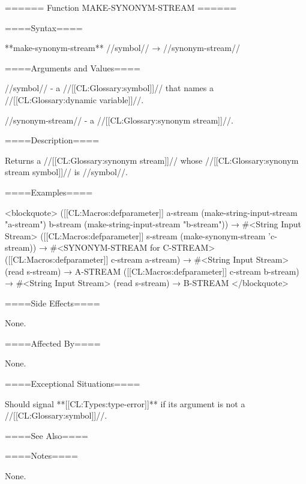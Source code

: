 ====== Function MAKE-SYNONYM-STREAM ======

====Syntax====

**make-synonym-stream** //symbol// → //synonym-stream//

====Arguments and Values====

//symbol// - a //[[CL:Glossary:symbol]]// that names a //[[CL:Glossary:dynamic variable]]//.

//synonym-stream// - a //[[CL:Glossary:synonym stream]]//.

====Description====

Returns a //[[CL:Glossary:synonym stream]]// whose //[[CL:Glossary:synonym stream symbol]]// is //symbol//.

====Examples====

<blockquote> ([[CL:Macros:defparameter]] a-stream (make-string-input-stream "a-stream") b-stream (make-string-input-stream "b-stream")) → #<String Input Stream> ([[CL:Macros:defparameter]] s-stream (make-synonym-stream 'c-stream)) → #<SYNONYM-STREAM for C-STREAM> ([[CL:Macros:defparameter]] c-stream a-stream) → #<String Input Stream> (read s-stream) → A-STREAM ([[CL:Macros:defparameter]] c-stream b-stream) → #<String Input Stream> (read s-stream) → B-STREAM </blockquote>

====Side Effects====

None.

====Affected By====

None.

====Exceptional Situations====

Should signal **[[CL:Types:type-error]]** if its argument is not a //[[CL:Glossary:symbol]]//.

====See Also====

{\secref\StreamConcepts}

====Notes====

None.

